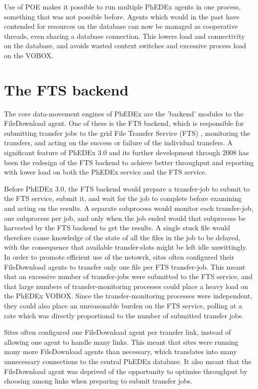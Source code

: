 \documentclass{PoS}
\begin{document}
Use of POE makes it possible to run multiple PhEDEx agents in one
process, something that was not possible before. Agents which would in
the past have contended for resources on the database can now be
managed as cooperative threads, even sharing a database
connection. This lowers load and connectivity on the database, and
avoids wasted context switches and excessive process load on the
VOBOX.

\section{The FTS backend}

The core data-movement engines of PhEDEx are the 'backend' modules to
the FileDownload agent. One of these is the FTS backend, which is
responsible for submitting transfer jobs to the grid File Transfer
Service (FTS) \cite{fts}, monitoring the transfers, and acting on the
success or failure of the individual transfers. A significant feature
of PhEDEx 3.0 and its further development through 2008 has been the
redesign of the FTS backend to achieve better throughput and reporting
with lower load on both the PhEDEx service and the FTS service.

Before PhEDEx 3.0, the FTS backend would prepare a transfer-job to
submit to the FTS service, submit it, and wait for the job to complete
before examining and acting on the results. A separate subprocess
would monitor each transfer-job, one subprocess per job, and only when
the job ended would that subprocess be harvested by the FTS backend to
get the results. A single stuck file would therefore cause knowledge
of the state of all the files in the job to be delayed, with the
consequence that available transfer-slots might be left idle
unwittingly. In order to promote efficient use of the netowrk, sites
often configured their FileDownload agents to transfer only one file
per FTS transfer-job. This meant that an excessive number of
transfer-jobs were submitted to the FTS service, and that large
numbers of transfer-monitoring processes could place a heavy load on
the PhEDEx VOBOX. Since the transfer-monitoring processes were
independent, they could also place an unreasonable burden on the FTS
service, polling at a rate which was directly proportional to the
number of submitted transfer jobs.

Sites often configured one FileDownload agent per transfer link,
instead of allowing one agent to handle many links. This meant that
sites were running many more FileDownload agents than necessary, which
translates into many unnecessary connections to the central PhEDEx
database. It also meant that the FileDownload agent was deprived of
the opportunity to optimise throughput by choosing among links when
preparing to submit transfer jobs.
\end{document}
